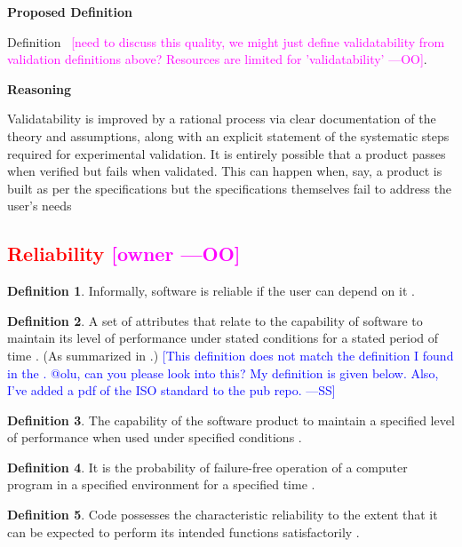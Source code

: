 \documentclass[letterpaper,cleveref]{lipics-v2019}
\newcommand{\authornote}[3]{\textcolor{#1}{[#3 ---#2]}}
\newcommand{\authornote}[3]{}
\newcommand{\wss}[1]{\authornote{blue}{SS}{#1}} %
\newcommand{\oo}[1]{\authornote{magenta}{OO}{#1}} %
\newcommand{\notdone}[1]{\textcolor{red}{#1}}
\theoremstyle{definition}
\newtheorem{defn}{Definition}
\begin{document}
\noindent \textbf{Proposed Definition}

Definition~ \oo{need to discuss this quality, we might just define
  validatability from validation definitions above? Resources are limited for
  'validatability'}.

\noindent \textbf{Reasoning}

Validatability is improved by a rational process via clear documentation of the
theory and assumptions, along with an explicit statement of the systematic steps
required for experimental validation. It is entirely possible that a product
passes when verified but fails when validated. This can happen when, say, a
product is built as per the specifications but the specifications themselves
fail to address the user’s needs

\subsection{\notdone{Reliability} \oo{owner}}

\begin{defn}
  Informally, software is reliable if the user can depend on it \citep{GhezziEtAl2003}.
\end{defn}

\begin{defn}
  A set of attributes that relate to the capability of software to maintain its
  level of performance under stated conditions for a stated period of time
  \citep{iso2001iec}. (As summarized in \citet{berander2005software}.)
  \wss{This definition does not match the definition I found in the
    \cite{ISO9126}.  @olu, can you please look into this?  My definition is
    given below.  Also, I've added a pdf of the ISO standard to the pub repo.}
\end{defn}

\begin{defn}
  The capability of the software product to maintain a specified level of
  performance when used under specified conditions \cite{ISO9126}.
\end{defn}

\begin{defn} \label{reliabilitySelected1} It is the probability of failure-free
  operation of a computer program in a specified environment for a specified
  time \citep{musa1987software}.
\end{defn} 
    
\begin{defn}
  Code possesses the characteristic reliability to the extent that it can be
  expected to perform its intended functions satisfactorily
  \citep{boehm1976quantitative}.
\end{defn}
\end{document}
